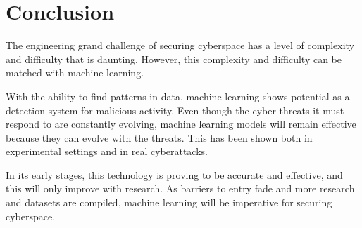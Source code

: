 \section{Conclusion}
The engineering grand challenge of securing cyberspace has a level of complexity and difficulty that is daunting.
However, this complexity and difficulty can be matched with machine learning.

With the ability to find patterns in data, machine learning shows potential as a detection system for malicious activity.
Even though the cyber threats it must respond to are constantly evolving, machine learning models will remain effective because they can evolve with the threats.
This has been shown both in experimental settings and in real cyberattacks.

In its early stages, this technology is proving to be accurate and effective, and this will only improve with research.
As barriers to entry fade and more research and datasets are compiled, machine learning will be imperative for securing cyberspace.
